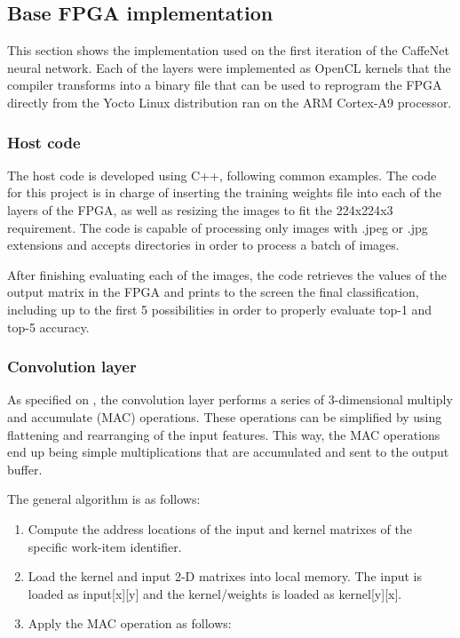 \begin{enumerate}
\subsection{Base FPGA implementation}

This section shows the implementation used on the first iteration of the CaffeNet neural network.
Each of the layers were implemented as OpenCL kernels that the compiler transforms into a binary
file that can be used to reprogram the FPGA directly from the Yocto Linux distribution ran
on the ARM Cortex-A9 processor.

\subsubsection{Host code}

The host code is developed using C++, following common \intelOCL examples. The code for this
project is in charge of inserting the training weights file into each of the layers of the
FPGA, as well as resizing the images to fit the 224{x}224{x}3 requirement. The code is capable
of processing only images with .jpeg or .jpg extensions and accepts directories in order to
process a batch of images.

After finishing evaluating each of the images, the code retrieves the values of the output 
matrix in the FPGA and prints to the screen the final classification, including up to the first 
5 possibilities in order to properly evaluate top-1 and top-5 accuracy.

\subsubsection{Convolution layer}

As specified on \cite{suda}, the convolution layer performs a series of 3-dimensional multiply and accumulate (MAC)
operations. These operations can be simplified by using flattening and rearranging of the input features. This way,
the MAC operations end up being simple multiplications that are accumulated and sent to the output buffer.

The general algorithm is as follows:
\begin{enumerate}
    \item Compute the address locations of the input and kernel matrixes
    of the specific work-item identifier.
    \item Load the kernel and input 2-D matrixes into local memory. The input is loaded
    as input[x][y] and the kernel/weights is loaded as kernel[y][x].
    \item Apply the MAC operation as follows: 
    

\end{enumerate}
\end{enumerate}
